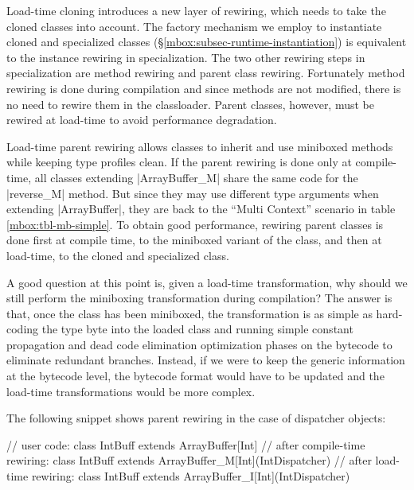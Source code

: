  Load-time cloning introduces a new layer of rewiring, which needs to take the cloned classes into account. The factory mechanism we employ to instantiate cloned and specialized classes (\S\ref{mbox:subsec-runtime-instantiation}) is equivalent to the instance rewiring in specialization. The two other rewiring steps in specialization are method rewiring and parent class rewiring. Fortunately method rewiring is done during compilation and since methods are not modified, there is no need to rewire them in the classloader. Parent classes, however, must be rewired at load-time to avoid performance degradation.

Load-time parent rewiring allows classes to inherit and use miniboxed methods while keeping type profiles clean. If the parent rewiring is done only at compile-time, all classes extending |ArrayBuffer_M| share the same code for the |reverse_M| method. But since they may use different type arguments when extending |ArrayBuffer|, they are back to the ``Multi Context'' scenario in table \ref{mbox:tbl-mb-simple}. To obtain good performance, rewiring parent classes is done first at compile time, to the miniboxed variant of the class, and then at load-time, to the cloned and specialized class.

A good question at this point is, given a load-time transformation, why should we still perform the miniboxing transformation during compilation? The answer is that, once the class has been miniboxed, the transformation is as simple as hard-coding the type byte into the loaded class and running simple constant propagation and dead code elimination optimization phases on the bytecode to eliminate redundant branches. Instead, if we were to keep the generic information at the bytecode level, the bytecode format would have to be updated and the load-time transformations would be more complex.

The following snippet shows parent rewiring in the case of dispatcher objects:

\begin{lstlisting-nobreak}
 // user code:
 class IntBuff extends ArrayBuffer[Int]
 // after compile-time rewiring:
 class IntBuff extends ArrayBuffer_M[Int](IntDispatcher)
 // after load-time rewiring:
 class IntBuff extends ArrayBuffer_I[Int](IntDispatcher)
\end{lstlisting-nobreak}

